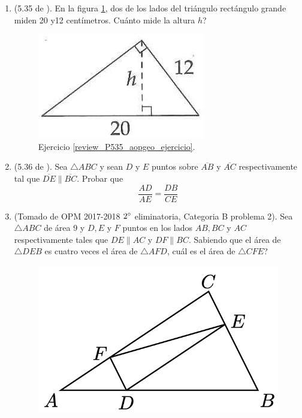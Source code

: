 \begin{enumerate}
		\item \label{review_P535_aopgeo_ejercicio} (5.35 de \cite{Aops_Geometria}). En la figura \ref{review_535_aopgeo_ejer}, dos de los lados del triángulo rectángulo grande miden 20 y12 centímetros. Cuánto mide la altura $h$?
		\begin{figure}[H]
			\centering
			\includegraphics[width=0.4\linewidth]{Geometria/imgs/review_535_aopgeo_ejer}
			\caption{Ejercicio \ref{review_P535_aopgeo_ejercicio}.}
			\label{review_535_aopgeo_ejer}
		\end{figure}
		
		\item \label{review_P536_aopgeo_ejercicio} (5.36 de \cite{Aops_Geometria}). Sea $\triangle ABC$ y sean $D$ y $E$ puntos sobre $\overline{AB}$ y $\overline{AC}$ respectivamente tal que $\overline{DE} \parallel \overline{BC}$. Probar que 
		\[
				\frac{ AD}{AE} = \frac{DB}{CE}
		\]
		
		\item (Tomado de OPM 2017-2018 $2\degree$ eliminatoria, Categoria B problema 2). Sea $\triangle ABC$ de área 9 y $D,E$ y $F$ puntos en los lados $AB, BC$ y $AC$ respectivamente tales que $DE\parallel AC$ y $DF\parallel BC$. Sabiendo que el área de $\triangle DEB$ es cuatro veces el área de $\triangle AFD$, cuál es el área de $\triangle CFE$?	
			\begin{figure}[H]
				\centering
				\includegraphics[width=0.45\linewidth]{Geometria/imgs/AV_P4}
				\label{avp4}
			\end{figure}
	\end{enumerate}
\newpage

